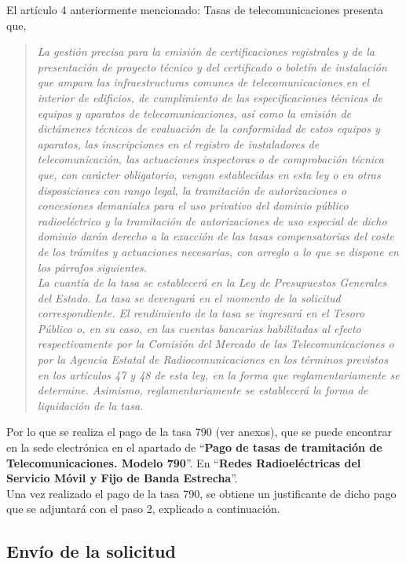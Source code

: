 El artículo 4 anteriormente mencionado: Tasas de telecomunicaciones presenta que,\\
\begin{quote}
\itshape
La gestión precisa para la emisión de certificaciones registrales y de la presentación de proyecto técnico y del certificado o boletín de instalación que ampara las infraestructuras comunes de telecomunicaciones en el interior de edificios, de cumplimiento de las especificaciones técnicas de equipos y aparatos de telecomunicaciones, así como la emisión de dictámenes técnicos de evaluación de la conformidad de estos equipos y aparatos, las inscripciones en el registro de instaladores de telecomunicación, las actuaciones inspectoras o de comprobación técnica que, con carácter obligatorio, vengan establecidas en esta ley o en otras disposiciones con rango legal, la tramitación de autorizaciones o concesiones demaniales para el uso privativo del dominio público radioeléctrico y la tramitación de autorizaciones de uso especial de dicho dominio darán derecho a la exacción de las tasas compensatorias del coste de los trámites y actuaciones necesarias, con arreglo a lo que se dispone en los párrafos siguientes.\\

La cuantía de la tasa se establecerá en la Ley de Presupuestos Generales del Estado. La tasa se devengará en el momento de la solicitud correspondiente. El rendimiento de la tasa se ingresará en el Tesoro Público o, en su caso, en las cuentas bancarias habilitadas al efecto respectivamente por la Comisión del Mercado de las Telecomunicaciones o por la Agencia Estatal de Radiocomunicaciones en los términos previstos en los artículos 47 y 48 de esta ley, en la forma que reglamentariamente se determine. Asimismo, reglamentariamente se establecerá la forma de liquidación de la tasa.
\end{quote}

Por lo que se realiza el pago de la tasa 790 (ver anexos), que se puede encontrar en la sede electrónica en el apartado de “\textbf{Pago de tasas de tramitación de Telecomunicaciones. Modelo 790}”. En “\textbf{Redes Radioeléctricas del Servicio Móvil y Fijo de Banda Estrecha}”.\\

Una vez realizado el pago de la tasa 790, se obtiene un justificante de dicho pago que se adjuntará con el paso 2, explicado a continuación.

\subsection{Envío de la solicitud}


